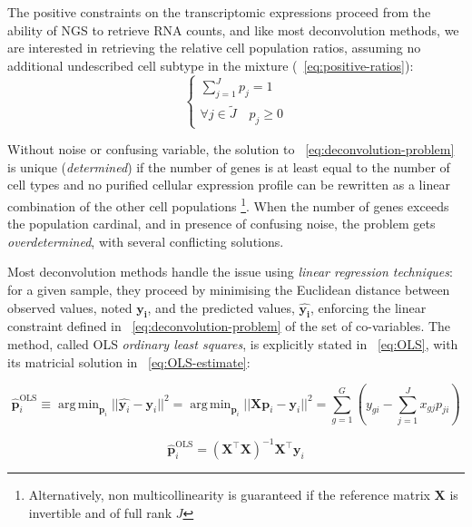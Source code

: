 \documentclass[long, final]{jobim}
\DeclareMathOperator*{\argmin}{arg\,min}
\begin{document}
The positive constraints on the transcriptomic expressions proceed from the ability of NGS to retrieve RNA counts, and like most deconvolution methods, we are interested in retrieving the relative cell population ratios, assuming no additional undescribed cell subtype in the mixture (\equationname ~\ref{eq:positive-ratios}):
\begin{equation}
\label{eq:positive-ratios}
\begin{cases}
\sum_{j=1}^J p_{j}=1\\
\forall j \in \widetilde{J} \quad p_j\ge 0
\end{cases}
\end{equation}


Without noise or confusing variable, the solution to \equationname ~\ref{eq:deconvolution-problem} is unique (\textit{determined}) if the number of genes is at least equal to the number of cell types and no purified cellular expression profile can be rewritten as a linear combination of the other cell populations \footnote{Alternatively, non multicollinearity is guaranteed if the reference matrix \(\boldsymbol{X}\) is invertible and of full rank \(J\)}. When the number of genes exceeds the population cardinal, and in presence of confusing noise, the problem gets \textit{overdetermined}, with several conflicting solutions.

Most deconvolution methods handle the issue using \textit{linear regression techniques}: for a given sample, they proceed by minimising the Euclidean distance between observed values, noted \(\boldsymbol{y_i}\), and the predicted values, \(\boldsymbol{\hat{y_i}} \), enforcing the linear constraint defined in \equationname ~\ref{eq:deconvolution-problem} of the set of co-variables. The method, called OLS \textit{ordinary least squares}, is explicitly stated in \equationname ~\ref{eq:OLS}, with its matricial solution in \equationname ~\ref{eq:OLS-estimate}:

\begin{equation}
 \label{eq:OLS}
 \boldsymbol{\hat{p}}_{i}^{\text{OLS}} \equiv \argmin_{\boldsymbol{p}_i} ||\hat{\boldsymbol{y}_i} - \boldsymbol{y}_i||^2 = \argmin_{\boldsymbol{p}_i}  ||\boldsymbol{X}\boldsymbol{p}_i - \boldsymbol{y}_i||^2 = \sum_{g=1}^G \left( y_{gi} - \sum_{j=1}^J  x_{gj} p_{ji}\right)   
\end{equation}

\begin{equation}
    \label{eq:OLS-estimate}
    \boldsymbol{\hat{p}}_{i}^{\text{OLS}} = (\boldsymbol{X}^\top\boldsymbol{X})^{-1}\boldsymbol{X}^\top \boldsymbol{y}_i
\end{equation}
\end{document}
